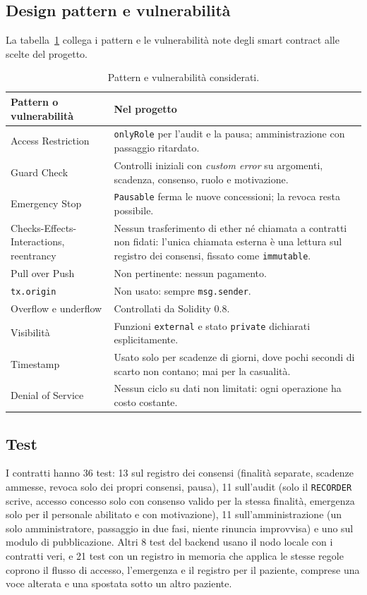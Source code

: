 \subsection{Design pattern e vulnerabilità}
La tabella~\ref{tab:pattern} collega i pattern e le vulnerabilità note degli smart contract\cite{wohrer-patterns,atzei-survey} alle scelte del progetto.

\begin{table}[H]
\centering\footnotesize
\renewcommand{\arraystretch}{1.15}
\begin{tabular}{@{}p{}p{}@{}}
\toprule
Pattern o vulnerabilità & Nel progetto\\
\midrule
Access Restriction & \texttt{onlyRole} per l'audit e la pausa; amministrazione con passaggio ritardato.\\
Guard Check & Controlli iniziali con \emph{custom error} su argomenti, scadenza, consenso, ruolo e motivazione.\\
Emergency Stop & \texttt{Pausable} ferma le nuove concessioni; la revoca resta possibile.\\
Checks-Effects-Interactions, reentrancy & Nessun trasferimento di ether né chiamata a contratti non fidati: l'unica chiamata esterna è una lettura sul registro dei consensi, fissato come \texttt{immutable}.\\
Pull over Push & Non pertinente: nessun pagamento.\\
\texttt{tx.origin} & Non usato: sempre \texttt{msg.sender}.\\
Overflow e underflow & Controllati da Solidity 0.8.\\
Visibilità & Funzioni \texttt{external} e stato \texttt{private} dichiarati esplicitamente.\\
Timestamp & Usato solo per scadenze di giorni, dove pochi secondi di scarto non contano; mai per la casualità.\\
Denial of Service & Nessun ciclo su dati non limitati: ogni operazione ha costo costante.\\
\bottomrule
\end{tabular}
\caption{Pattern e vulnerabilità considerati.}\label{tab:pattern}
\end{table}

\subsection{Test}\label{sec:test}
I contratti hanno 36 test: 13 sul registro dei consensi (finalità separate, scadenze ammesse, revoca solo dei propri consensi, pausa), 11 sull'audit (solo il \texttt{RECORDER} scrive, accesso concesso solo con consenso valido per la stessa finalità, emergenza solo per il personale abilitato e con motivazione), 11 sull'amministrazione (un solo amministratore, passaggio in due fasi, niente rinuncia improvvisa) e uno sul modulo di pubblicazione. Altri 8 test del backend usano il nodo locale con i contratti veri, e 21 test con un registro in memoria che applica le stesse regole coprono il flusso di accesso, l'emergenza e il registro per il paziente, comprese una voce alterata e una spostata sotto un altro paziente.

